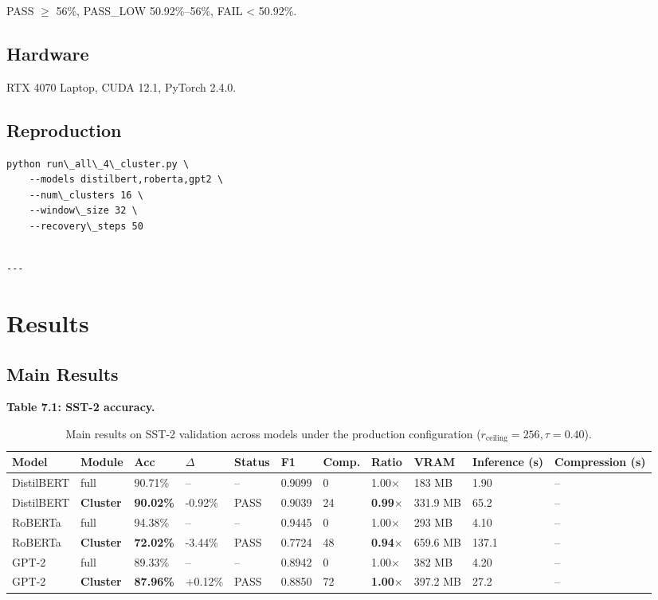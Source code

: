 PASS $\ge$ 56\%, PASS\_LOW 50.92\%--56\%, FAIL \textless{} 50.92\%.

\subsection{Hardware}

RTX 4070 Laptop, CUDA 12.1, PyTorch 2.4.0.

\subsection{Reproduction}

\begin{lstlisting}
python run\_all\_4\_cluster.py \
    --models distilbert,roberta,gpt2 \
    --num\_clusters 16 \
    --window\_size 32 \
    --recovery\_steps 50
\end{lstlisting}
\begin{lstlisting}

---
\end{lstlisting}

\section{Results}

\subsection{Main Results}

\textbf{Table 7.1: SST-2 accuracy.}

\begin{table}[t]
\centering
\small
\begin{tabular}{lllllllllll}
\toprule
\textbf{Model} & \textbf{Module} & \textbf{Acc} & \textbf{$\Delta$} & \textbf{Status} & \textbf{F1} & \textbf{Comp.} & \textbf{Ratio} & \textbf{VRAM} & \textbf{Inference (s)} & \textbf{Compression (s)} \\
\midrule
DistilBERT & full & 90.71\% & -- & -- & 0.9099 & 0 & 1.00$\times$ & 183 MB & 1.90 & -- \\
DistilBERT & \textbf{Cluster} & \textbf{90.02\%} & -0.92\% & PASS & 0.9039 & 24 & \textbf{0.99$\times$} & 331.9 MB & 65.2 & -- \\
RoBERTa & full & 94.38\% & -- & -- & 0.9445 & 0 & 1.00$\times$ & 293 MB & 4.10 & -- \\
RoBERTa & \textbf{Cluster} & \textbf{72.02\%} & -3.44\% & PASS & 0.7724 & 48 & \textbf{0.94$\times$} & 659.6 MB & 137.1 & -- \\
GPT-2 & full & 89.33\% & -- & -- & 0.8942 & 0 & 1.00$\times$ & 382 MB & 4.20 & -- \\
GPT-2 & \textbf{Cluster} & \textbf{87.96\%} & +0.12\% & PASS & 0.8850 & 72 & \textbf{1.00$\times$} & 397.2 MB & 27.2 & -- \\
\bottomrule
\end{tabular}
\caption{Main results on SST-2 validation across models under the production configuration ($r_{\mathrm{ceiling}}=256, \tau=0.40$).}
\label{tab:main_sst2}
\end{table}

